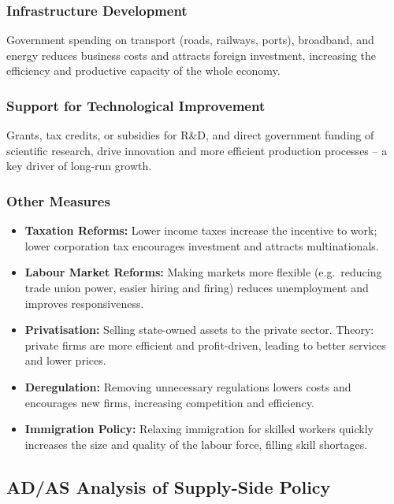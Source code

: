 \documentclass[11pt, a4paper, twoside]{book}
\begin{document}
\subsubsection{Infrastructure Development}

Government spending on transport (roads, railways, ports), broadband, and energy reduces business costs and attracts foreign investment, increasing the efficiency and productive capacity of the whole economy.

\subsubsection{Support for Technological Improvement}

Grants, tax credits, or subsidies for R\&D, and direct government funding of scientific research, drive innovation and more efficient production processes -- a key driver of long-run growth.

\subsubsection{Other Measures}

\begin{itemize}
  \item \textbf{Taxation Reforms:} Lower income taxes increase the incentive to work; lower corporation tax encourages investment and attracts multinationals.
  \item \textbf{Labour Market Reforms:} Making markets more flexible (e.g.\ reducing trade union power, easier hiring and firing) reduces unemployment and improves responsiveness.
  \item \textbf{Privatisation:} Selling state-owned assets to the private sector. Theory: private firms are more efficient and profit-driven, leading to better services and lower prices.
  \item \textbf{Deregulation:} Removing unnecessary regulations lowers costs and encourages new firms, increasing competition and efficiency.
  \item \textbf{Immigration Policy:} Relaxing immigration for skilled workers quickly increases the size and quality of the labour force, filling skill shortages.
\end{itemize}

\subsection{AD/AS Analysis of Supply-Side Policy}
\end{document}
